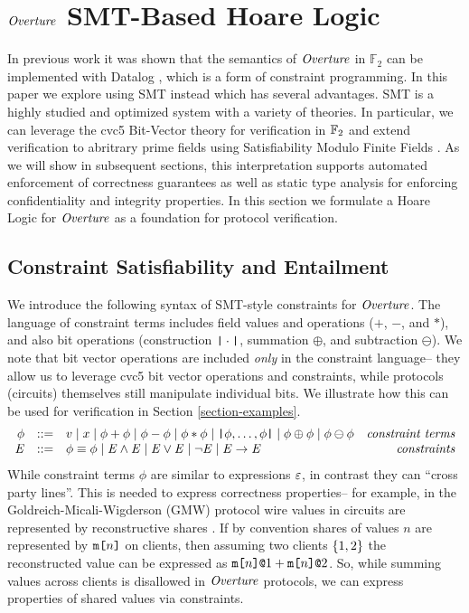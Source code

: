 \section{$\mathit{Overture}$ SMT-Based Hoare Logic}
\label{section-smt}

In previous work it was shown that the semantics of $\mathit{Overture}$ in
$\mathbb{F}_2$ can be implemented with Datalog
\cite{skalka-near-ppdp24}, which is a form of constraint
programming. In this paper we explore using SMT instead which
has several advantages. SMT is a highly studied and optimized
system with a variety of theories. In particular, we can leverage
the cvc5 Bit-Vector theory for verification in $\mathbb{F}_{2}$
and extend verification to abritrary prime fields using 
Satisfiability Modulo Finite Fields \cite{SMFF}. As we will
show in subsequent sections, this interpretation supports automated
enforcement of correctness guarantees as well as static type analysis
for enforcing confidentiality and integrity properties.  In this
section we formulate a Hoare Logic for $\mathit{Overture}$ as a foundation for
protocol verification.

\subsection{Constraint Satisfiability and Entailment}

We introduce the following syntax of SMT-style constraints for
$\mathit{Overture}$. The language of constraint terms includes field values
and operations ($+$, $-$, and $*$), and also bit operations
(construction $\texttt{|}\cdot\texttt{|}$, summation $\oplus$, and subtraction
$\ominus$). We note that bit vector operations are included \emph{only}
in the constraint language-- they allow us to leverage cvc5 bit vector
operations and constraints, while protocols (circuits) themselves
still manipulate individual bits. We illustrate how this can be used for
verification in Section \ref{section-examples}.
$$
\begin{array}{rclr}
  \phi &::=& v \mid x \mid \phi + \phi \mid \phi - \phi \mid \phi * \phi
     \mid \texttt{|}\phi,\ldots,\phi\texttt{|} \mid \phi \oplus \phi \mid \phi \ominus \phi & \textit{constraint terms}\\ 
     \mathit{E} &::=& \phi \equiv \phi \mid \mathit{E} \wedge \mathit{E} \mid \mathit{E} \vee \mathit{E} \mid \neg\mathit{E} \mid \mathit{E} \rightarrow \mathit{E}
        & \textit{constraints} 
\end{array}
$$
%
While constraint terms $\phi$ are similar to expressions $\varepsilon$,
in contrast they can ``cross party lines''. This is needed
to express correctness properties-- for example, in the
Goldreich-Micali-Wigderson (GMW) protocol wire values in circuits are
represented by reconstructive shares \cite{evans2018pragmatic}.  If by
convention shares of values $n$ are represented by $\texttt{m[}n\texttt{]}$ on
clients, then assuming two clients $\{ 1,2 \}$ the reconstructed
value can be expressed as $\texttt{m[}n\texttt{]}\texttt{@}1 + \texttt{m[}n\texttt{]}\texttt{@}2$.  So, while summing
values across clients is disallowed in $\mathit{Overture}$ protocols, we can
express properties of shared values via constraints.

